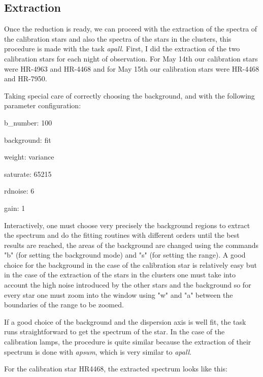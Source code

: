 \subsection{Extraction}

Once the reduction is ready, we can proceed with the extraction of the spectra of the calibration stars and also the spectra of the stars in the clusters, this procedure is made with the task \textit{apall}. First, I did the extraction of the two calibration stars for each night of observation. For May 14th our calibration stars were HR-4963 and HR-4468 and for May 15th our calibration stars were HR-4468 and HR-7950.

Taking special care of correctly choosing the background, and with the following parameter configuration:

b\_number: 100

background: fit

weight: variance

saturate: 65215

rdnoise: 6

gain: 1

Interactively, one must choose very precisely the background regions to extract the spectrum and do the fitting routines with different orders until the best results are reached, the areas of the background are changed using the commands "b" (for setting the background mode) and "s" (for setting the range). A good choice for the background in the case of the calibration star is relatively easy but in the case of the extraction of the stars in the clusters one must take into account the high noise introduced by the other stars and the background so for every star one must zoom into the window using "w" and "a" between the boundaries of the range to be zoomed.

If a good choice of the background and the dispersion axis is well fit, the task runs straightforward to get the spectrum of the star. In the case of the calibration lamps, the procedure is quite similar because the extraction of their spectrum is done with \textit{apsum}, which is very similar to \textit{apall}. 

For the calibration star HR4468, the extracted spectrum looks like this:


